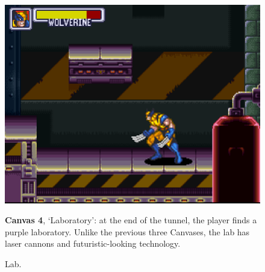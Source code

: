 \documentclass[english]{textolivre}
\begin{document}
\begin{figure}[htbp]
\begin{minipage}[t]{.47\textwidth}
\vspace{0pt}
\includegraphics[width=\textwidth]{fig-7.png}
\caption{Lab.}
\label{fig-7}
\end{minipage}
\hfill
\begin{minipage}[t]{.47\textwidth}
\vspace{2pt}
\textbf{Canvas 4}, ‘Laboratory’: at the end of the tunnel, the player finds a purple laboratory. Unlike the previous three Canvases, the lab has laser cannons and futuristic-looking technology.
\end{minipage}
\end{figure}
\end{document}
